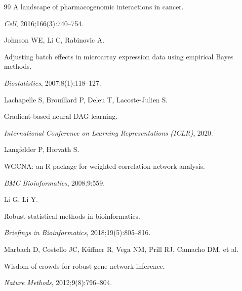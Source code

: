 \documentclass[12pt,a4paper]{article}
\begin{document}
\begin{thebibliography}{99}
A landscape of pharmacogenomic interactions in cancer.




\textit{Cell}, 2016;166(3):740--754.




Johnson WE, Li C, Rabinovic A.




Adjusting batch effects in microarray expression data using empirical Bayes methods.




\textit{Biostatistics}, 2007;8(1):118--127.




Lachapelle S, Brouillard P, Deleu T, Lacoste-Julien S.




Gradient-based neural DAG learning.




\textit{International Conference on Learning Representations (ICLR)}, 2020.




Langfelder P, Horvath S.




WGCNA: an R package for weighted correlation network analysis.




\textit{BMC Bioinformatics}, 2008;9:559.




Li G, Li Y.




Robust statistical methods in bioinformatics.




\textit{Briefings in Bioinformatics}, 2018;19(5):805--816.




Marbach D, Costello JC, K\"{u}ffner R, Vega NM, Prill RJ, Camacho DM, et al.




Wisdom of crowds for robust gene network inference.




\textit{Nature Methods}, 2012;9(8):796--804.





\end{thebibliography}
\end{document}
